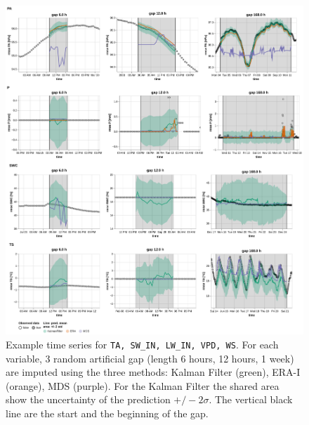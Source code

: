 \documentclass{article}
\newcommand{\imgwidth}{6in}
\begin{document}
\begin{figure}
\centerline{\includegraphics[width=\imgwidth]{timeseries_2}}
\caption{Example time series for \texttt{TA, SW\_IN, LW\_IN, VPD, WS}. For each variable, 3 random artificial gap (length 6 hours, 12 hours, 1 week) are imputed using the three methods: Kalman Filter (green), ERA-I (orange), MDS (purple). For the Kalman Filter the shared area show the uncertainty of the prediction $+/- 2 \sigma$. The vertical black line are the start and the beginning of the gap.}
\label{fig:ts_2_0}
\end{figure}



\end{document}

